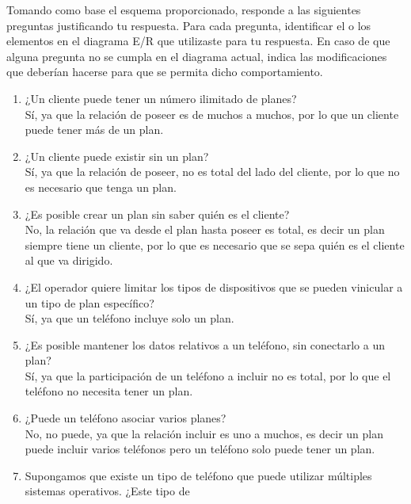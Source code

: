 \documentclass[a4paper, 12pt]{report}
\begin{document}
\begin{enumerate}
{\begin{enumerate}
{        Tomando  como base el esquema proporcionado, responde a las
        siguientes preguntas justificando tu respuesta. Para cada
        pregunta, identificar el o los elementos en el diagrama E/R
        que utilizaste para tu respuesta. En caso de que alguna
        pregunta no se cumpla en el diagrama actual, indica las
        modificaciones que deberían hacerse para que se permita dicho
        comportamiento.\\
        \begin{enumerate}
            \item ¿Un cliente puede tener un número ilimitado de planes?\\
            Sí, ya que la relación de poseer es de muchos a muchos, por
            lo que un cliente puede tener más de un plan.
            \item ¿Un cliente puede existir sin un plan?\\
            Sí, ya que la relación de poseer, no es total del lado del
            cliente, por lo que no es necesario que tenga un plan.
            \item ¿Es posible crear un plan sin saber quién es el
            cliente?\\
            No, la relación que va desde el plan hasta poseer es total,
            es decir un plan siempre tiene un cliente, por lo que es
            necesario que se sepa quién es el cliente al que va
            dirigido.
            \item ¿El operador quiere limitar los tipos de dispositivos
            que se pueden vinicular a un tipo de plan específico?\\
            Sí, ya que un teléfono incluye solo un plan.
            \item ¿Es posible mantener los datos relativos a un
            teléfono, sin conectarlo a un plan?\\
            Sí, ya que la participación de un teléfono a incluir no es
            total, por lo que el teléfono no necesita tener un plan.
            \item ¿Puede un teléfono asociar varios planes?\\
            No, no puede, ya que la relación incluir es uno a muchos,
            es decir un plan puede incluir varios teléfonos pero un
            teléfono solo puede tener un plan.
            \item Supongamos que existe un tipo de teléfono que puede
            utilizar múltiples sistemas operativos. ¿Este tipo de

\end{enumerate}}
\end{enumerate}}
\end{enumerate}
\end{document}
